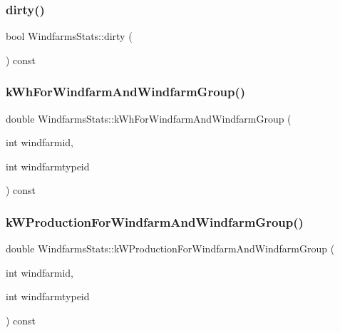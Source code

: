 \mbox{\label{class_windfarms_stats_ab6c5b16f34f3d3574d847990fa41d4d2}} 
\subsubsection{\texorpdfstring{dirty()}{dirty()}}
{\footnotesize\ttfamily bool Windfarms\+Stats\+::dirty (\begin{DoxyParamCaption}{ }\end{DoxyParamCaption}) const\hspace{0.3cm}{\ttfamily [inline]}}

\mbox{\label{class_windfarms_stats_aff9a8e302cfa6c735e480035bc333bdb}} 
\subsubsection{\texorpdfstring{kWhForWindfarmAndWindfarmGroup()}{kWhForWindfarmAndWindfarmGroup()}}
{\footnotesize\ttfamily double Windfarms\+Stats\+::k\+Wh\+For\+Windfarm\+And\+Windfarm\+Group (\begin{DoxyParamCaption}\item[{int}]{windfarmid,  }\item[{int}]{windfarmtypeid }\end{DoxyParamCaption}) const}

\mbox{\label{class_windfarms_stats_ae167ae1837e183c2d9e739b13ad2995c}} 
\subsubsection{\texorpdfstring{kWProductionForWindfarmAndWindfarmGroup()}{kWProductionForWindfarmAndWindfarmGroup()}}
{\footnotesize\ttfamily double Windfarms\+Stats\+::k\+W\+Production\+For\+Windfarm\+And\+Windfarm\+Group (\begin{DoxyParamCaption}\item[{int}]{windfarmid,  }\item[{int}]{windfarmtypeid }\end{DoxyParamCaption}) const}

